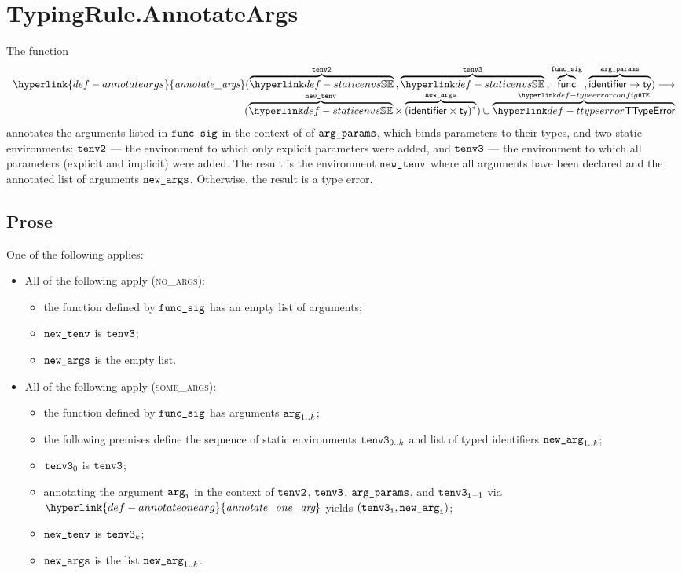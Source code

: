 \documentclass{book}
\newcommand\ProseOtherwiseTypeError[0]{Otherwise, the result is a type error.}
\newcommand\ProseOrTypeError[0]{\ProseTerminateAs{\TypeErrorConfig}}
\newcommand\annotateargs[0]{\hyperlink{def-annotateargs}{\textfunc{annotate\_args}}}
\newcommand\annotateonearg[0]{\hyperlink{def-annotateonearg}{\textfunc{annotate\_one\_arg}}}
\begin{document}
\section{TypingRule.AnnotateArgs \label{sec:TypingRule.AnnotateArgs}}
\hypertarget{def-annotateargs}{}
The function
\[
\begin{array}{r}
\annotateargs(
  \overname{\staticenvs}{\tenvtwo} \aslsep
  \overname{\staticenvs}{\tenvthree} \aslsep
  \overname{\func}{\funcsig} \aslsep
  \overname{\identifier\rightarrow\ty}{\argparams}
)
\aslto \\
(\overname{\staticenvs}{\newtenv} \times \overname{(\identifier\times\ty)^*}{\vnewargs})
\cup \overname{\TTypeError}{\TypeErrorConfig}
\end{array}
\]
annotates the arguments listed in $\texttt{func\_sig}$ in the context of
of $\texttt{arg\_params}$, which binds parameters to their types,
and two static environments:
$\texttt{tenv2}$ --- the environment to which only explicit parameters were added, and
$\texttt{tenv3}$ --- the environment to which all parameters (explicit and implicit) were added.
The result is the environment $\texttt{new\_tenv}$ where all arguments have been declared and
the annotated list of arguments $\texttt{new\_args}$.
\ProseOtherwiseTypeError

\subsection{Prose}
One of the following applies:
\begin{itemize}
  \item All of the following apply (\textsc{no\_args}):
  \begin{itemize}
    \item the function defined by $\texttt{func\_sig}$ has an empty list of arguments;
    \item $\texttt{new\_tenv}$ is $\texttt{tenv3}$;
    \item $\texttt{new\_args}$ is the empty list.
  \end{itemize}

  \item All of the following apply (\textsc{some\_args}):
  \begin{itemize}
    \item the function defined by $\texttt{func\_sig}$ has arguments $\texttt{arg}_{1..k}$;
    \item the following premises define the sequence of static environments $\texttt{tenv3}_{0..k}$ and
          list of typed identifiers $\texttt{new\_arg}_{1..k}$;
    \item $\texttt{tenv3}_0$ is $\texttt{tenv3}$;
    \item annotating the argument $\texttt{arg}_{\texttt{i}}$ in the context of $\texttt{tenv2}$, $\texttt{tenv3}$, $\texttt{arg\_params}$,
          and $\texttt{tenv3}_{\texttt{i}-1}$ via $\annotateonearg$ yields $(\texttt{tenv3}_{\texttt{i}}, \texttt{new\_arg}_{\texttt{i}})$\ProseOrTypeError;
    \item $\texttt{new\_tenv}$ is $\texttt{tenv3}_k$;
    \item $\texttt{new\_args}$ is the list $\texttt{new\_arg}_{1..k}$.
  \end{itemize}
\end{itemize}
\end{document}
